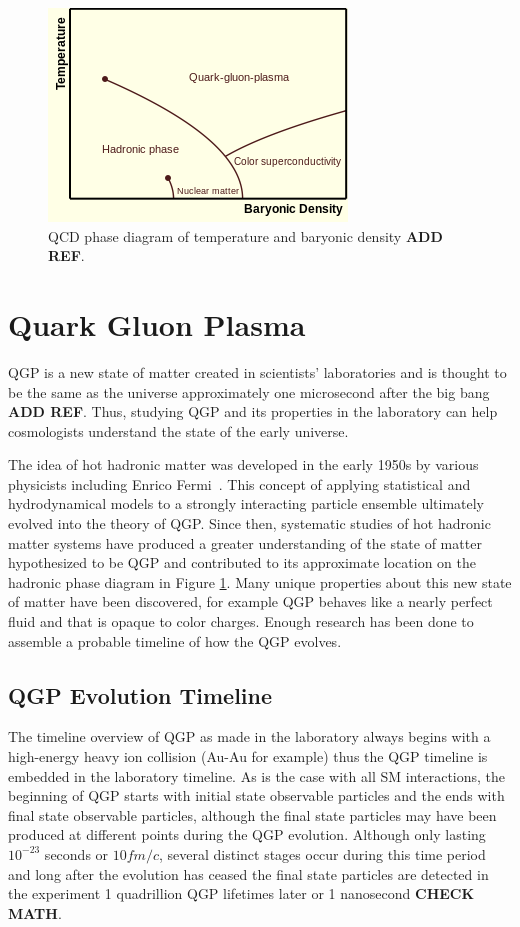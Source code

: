 \begin{figure}[!ht]
\begin{center}
\includegraphics[width=0.55\linewidth]{figs/qcd_phase_diagram.png}
\caption{QCD phase diagram of temperature and baryonic density \textbf{ADD REF}.}
\end{center}
\label{fig:qcd_phase}
\end{figure}

\section{Quark Gluon Plasma}
QGP is a new state of matter created in scientists' laboratories and is thought to be the same as the universe approximately one microsecond after the big bang \textbf{ADD REF}. Thus, studying QGP and its properties in the laboratory can help cosmologists understand the state of the early universe.

The idea of hot hadronic matter was developed in the early 1950s by various physicists including Enrico Fermi~\cite{Fermi01071950}. This concept of applying statistical and hydrodynamical models to a strongly interacting particle ensemble ultimately evolved into the theory of QGP. Since then, systematic studies of hot hadronic matter systems have produced a greater understanding of the state of matter hypothesized to be QGP and contributed to its approximate location on the hadronic phase diagram in Figure \ref{fig:qcd_phase}. Many unique properties about this new state of matter have been discovered, for example QGP behaves like a nearly perfect fluid and that is opaque to color charges. Enough research has been done to assemble a probable timeline of how the QGP evolves.

\subsection{QGP Evolution Timeline}
The timeline overview of QGP as made in the laboratory always begins with a high-energy heavy ion collision (Au-Au for example) thus the QGP timeline is embedded in the laboratory timeline. As is the case with all SM interactions, the beginning of QGP starts with initial state observable particles and the ends with final state observable particles, although the final state particles may have been produced at different points during the QGP evolution. Although only lasting $10^{-23}$ seconds or $10 fm/c$, several distinct stages occur during this time period and long after the evolution has ceased the final state particles are detected in the experiment 1 quadrillion QGP lifetimes later or 1 nanosecond \textbf{CHECK MATH}.

